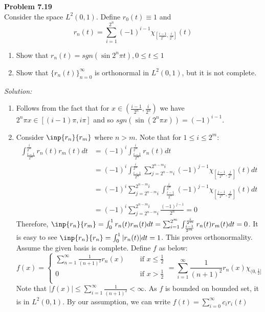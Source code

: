 \documentclass[a4paper, 11pt]{article}
\newenvironment{problem}[2][Problem]
    { \begin{mdframed}[backgroundcolor=gray!20] \textbf{#1 #2} \\}
    {  \end{mdframed}}
\newenvironment{solution}
    {\textit{Solution:}}
    {}
\begin{document}
\begin{problem}{7.19}
    Consider the space $L^2(0,1)$. Define $r_0(t)\equiv 1$ and 
    $$r_n(t)=\sum_{i=1}^{2^n}(-1)^{i-1}\chi_{\left[\frac{i-1}{2^n},\frac{i}{2^n}\right]}(t)$$
    \begin{enumerate}
        \item Show that $r_n(t)=sgn(\sin 2^n\pi t),0\leq t\leq 1 $
        \item Show that $\{r_n(t)\}_{n=0}^\infty$ is orthonormal in $L^2(0,1)$, but it is not complete. 
    \end{enumerate}
\end{problem}
\begin{solution}
    
\begin{enumerate}
    \item Follows from the fact that for $x\in\left(\frac{i-1}{2^n},\frac{i}{2^n}\right)$ we have\  $2^n\pi x\in[(i-1)\pi,i\pi]$ and so $sgn(\sin(2^n\pi x))=(-1)^{i-1}$. 
    \item Consider $\inp{r_n}{r_m}$ where $n>m$. Note that for $1\leq i\leq 2^m$:
    \begin{align*}
        \int_{\frac{i-1}{2^m}}^{\frac{i}{2^m}}r_n(t) r_m(t)dt&=(-1)^i\int_{\frac{i-1}{2^m}}^{\frac{i}{2^m}}r_n(t)dt\\
        &=(-1)^i\int_{\frac{i-1}{2^m}}^{\frac{i}{2^m}}\sum_{j=2^{n-m}i}^{2^{n-m}i}(-1)^{j-1}\chi_{\left[\frac{j-1}{2^n},\frac{j}{2^n}\right]}(t)dt\\
        &=(-1)^i\sum_{j=2^{n-m}i}^{2^{n-m}i}\int_{\frac{i-1}{2^m}}^{\frac{i}{2^m}}(-1)^{j-1}\chi_{\left[\frac{j-1}{2^n},\frac{j}{2^n}\right]}(t)dt\\
        &=(-1)^i\sum_{j=2^{n-m}i}^{2^{n-m}i}\frac{(-1)^{j-1}}{2^n}=0
    \end{align*}
    Therefore, $\inp{r_n}{r_m}=\int_0^1r_n(t)r_m(t)dt=\sum_{i=1}^{2^m}\int_{\frac{i-1}{2^m}}^{\frac{i}{2^m}}r_n(t) r_m(t)dt=0$. It is easy to see $\inp{r_n}{r_n}=\int_0^1|r_n(t)|dt=1$. This proves orthonormality.\\
    Assume the given basis is complete. Define $f$ as below:
    $$f(x)=\begin{cases}
       \sum_{n=1}^\infty \frac{1}{(n+1)^2}r_n(x)&\quad\text{ if }x\leq \frac{1}{2}\\
       0&\quad\text{ if }x> \frac{1}{2}\\ 
    \end{cases}=\sum_{i=1}^\infty \frac{1}{(n+1)^2}r_n(x)\chi_{(0,\frac{1}{2}]}$$
    Note that $|f(x)|\leq \sum_{i=1}^\infty \frac{1}{(n+1)^2}<\infty$. As $f$ is bounded on bounded set, it is in $L^2(0,1)$. By our assumption, we can write $f(t)=\sum_{i=0}^\infty c_ir_i(t)$

\end{enumerate}
\end{solution}
\end{document}
